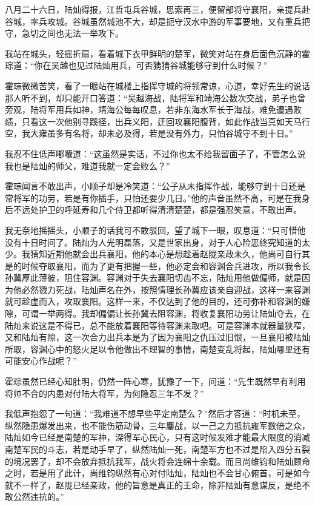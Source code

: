 八月二十六日，陆灿得报，江哲屯兵谷城，思索再三，便留部将守襄阳，亲提兵赴谷城，率兵攻城。谷城虽然城池不大，却是扼守汉水中游的军事要地，又有重兵把守，急切之间也无法一举攻下。

我站在城头，轻摇折扇，看着城下衣甲鲜明的楚军，微笑对站在身后面色沉静的霍琮道：“你在吴越也见过陆灿用兵，可否猜猜谷城能够守到什么时候？”

霍琮微微苦笑，看了一眼站在城楼上指挥守城的将领常谅，心道，幸好先生的说话那人听不到，却只能开口答道：“吴越海战，陆将军和靖海公数次交战，弟子也曾旁观，陆将军用兵如神，靖海公每每叹息，若非东海水军长于海战，难免遭遇败绩，只看这一次他别寻蹊径，出兵义阳，迂回攻襄阳腹背，如此作战当真如天马行空，我大雍虽多有名将，却未必及得，若是没有外力，只怕谷城守不到十日。”

我忍不住低声嘟囔道：“这虽然是实话，不过你也太不给我留面子了，不管怎么说我也是陆灿的师父，难道我就一定会败么？”

霍琮闻言不敢出声，小顺子却是冷笑道：“公子从未指挥作战，能够守到十日还是常将军的功劳，若是有你插手，只怕还要少几日。”他的声音虽然不高，可是在我身后不远处护卫的呼延寿和几个侍卫都听得清清楚楚，都是强忍笑意，不敢出声。

我无奈地摇摇头，小顺子的话我可不敢驳回，望了城下一眼，叹息道：“只可惜他没有十日时间了。陆灿为人光明磊落，又是世家出身，对于人心险恶终究知道的太少。我猜知近期他就会出兵襄阳，他的本心是想趁着赵陇亲政未久，他尚可自行其是的时候夺取襄阳，而为了更有把握一些，他必定会和容渊合兵进攻，所以我令长孙冀厚此薄彼，阻住容渊。容渊对于失去襄阳切齿不忘，陆灿用他做偏师，就是因为他必然戮力死战，陆灿声名在外，按照情理长孙冀应该亲自迎战，这样一来容渊就可趁虚而入，攻取襄阳。这样一来，不仅达到了他的目的，还可弥补和容渊的嫌隙，可谓一举两得。我却偏偏让长孙冀去阻容渊，将收复襄阳功劳让陆灿夺去，在陆灿来说这是不得已，总不能放着襄阳等待容渊来取吧。可是容渊本就器量狭窄，又和陆灿有隙，这一次合力出兵本是为了因为襄阳之仇压过旧恨，一旦襄阳被陆灿所取，容渊心中的怒火足以令他做出不理智的事情，南楚变乱将起，陆灿哪里还有可能安心作战呢？”

霍琮虽然已经心知肚明，仍然一阵心寒，犹豫了一下，问道：“先生既然早有利用将帅不合的内患对付陆大将军，为何隐忍三年不发？”

我低声抱怨了一句道：“我难道不想早些平定南楚么？”然后才答道：“时机未至，纵然隐患爆发出来，也不能伤筋动骨，三年鏖战，以一己之力抵抗雍军数倍之众，陆灿如今已经是南楚的军神，深得军心民心，只有这时候发难才能最大限度的消减南楚军民的斗志，若是动手早了，纵然陆灿一死，南楚军方也不过是陷入四分五裂的境况罢了，却不会放弃抵抗我军，战火将会连绵十余载。而且尚维钧和陆灿顾命之时，若是用了此计，尚维钧纵然有心对付陆灿，陆灿也不会甘心俯首，可是如今就不一样了，赵陇已经亲政，他的旨意是真正的王命，除非陆灿有意谋反，是绝不敢公然违抗的。”

